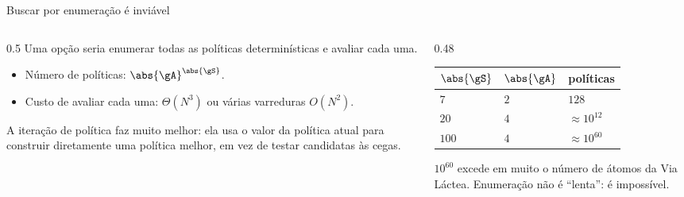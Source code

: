 \documentclass[aspectratio=169, 11pt]{beamer}
\begin{document}
\begin{frame}{Buscar por enumeração é inviável}
  \begin{columns}[T]
    \begin{column}{0.5\textwidth}
      Uma opção seria enumerar todas as políticas determinísticas e avaliar cada uma.
      \begin{itemize}\setlength{\itemsep}{0.3ex}
        \item Número de políticas: $\abs{\gA}^{\abs{\gS}}$.
        \item Custo de avaliar cada uma: $\Theta(N^3)$ ou várias varreduras $O(N^2)$.
      \end{itemize}
      \vspace{0.4em}
      A \alert{iteração de política} faz muito melhor: ela usa o valor da política atual
      para construir diretamente uma política melhor, em vez de testar candidatas às cegas.
    \end{column}
    \begin{column}{0.48\textwidth}
      \begin{center}\small
      \begin{tabular}{@{}lll@{}}
        \toprule
        $\abs{\gS}$ & $\abs{\gA}$ & políticas \\
        \midrule
        $7$   & $2$ & $128$ \\
        $20$  & $4$ & $\approx 10^{12}$ \\
        $100$ & $4$ & $\approx 10^{60}$ \\
        \bottomrule
      \end{tabular}
      \end{center}
      \vspace{0.5em}
      \begin{alertabox}
        $10^{60}$ excede em muito o número de átomos da Via Láctea. Enumeração não é
        ``lenta'': é impossível.
      \end{alertabox}
    \end{column}
  \end{columns}
\end{frame}
\end{document}
